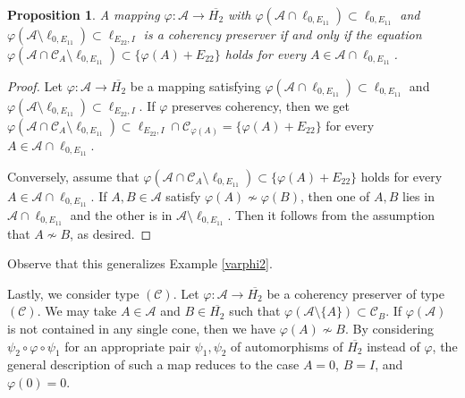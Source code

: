 \documentclass[10pt]{amsart}
\newtheorem{proposition}[theorem]{Proposition}
\theoremstyle{definition}
\theoremstyle{remark}
\numberwithin{subsection}{section}
\numberwithin{equation}{section}
\newcommand\cC{{\mathcal{C}}}
\newcommand\oH{{\overline{H_2}}}
\begin{document}
\begin{proposition}\label{ljzggr}
A mapping $\varphi\colon \mathcal{A}\to \oH$ with $\varphi(\mathcal{A}\cap \ell_{0, E_{11}})\subset \ell_{0, E_{11}}$ and $\varphi(\mathcal{A}\setminus  \ell_{0, E_{11}})\subset \ell_{E_{22}, I}$ is a coherency preserver if and only if the equation $\varphi(\mathcal{A}\cap \mathcal{C}_A\setminus  \ell_{0, E_{11}}) \subset\{\varphi(A)+E_{22}\}$ holds for every $A\in \mathcal{A}\cap \ell_{0, E_{11}}$. 
\end{proposition}
\begin{proof}
Let $\varphi\colon \mathcal{A}\to \oH$ be a mapping satisfying $\varphi(\mathcal{A}\cap \ell_{0, E_{11}})\subset \ell_{0, E_{11}}$ and $\varphi(\mathcal{A}\setminus  \ell_{0, E_{11}})\subset \ell_{E_{22}, I}$. 
If $\varphi$ preserves coherency, then we get $\varphi(\mathcal{A}\cap \mathcal{C}_A\setminus  \ell_{0, E_{11}}) \subset \ell_{E_{22}, I} \cap \cC_{\varphi(A)}=\{\varphi(A)+E_{22}\}$ for every $A\in \mathcal{A}\cap \ell_{0, E_{11}}$. 

Conversely, assume that $\varphi(\mathcal{A}\cap \mathcal{C}_A\setminus  \ell_{0, E_{11}}) \subset \{\varphi(A)+E_{22}\}$ holds for every $A\in \mathcal{A}\cap \ell_{0, E_{11}}$. 
If $A, B\in \mathcal{A}$ satisfy $\varphi(A)\not\sim \varphi(B)$, then one of $A, B$ lies in $\mathcal{A}\cap \ell_{0, E_{11}}$ and the other is in $\mathcal{A}\setminus  \ell_{0, E_{11}}$. 
Then it follows from the assumption that $A\not\sim B$, as desired.
\end{proof}
Observe that this generalizes Example \ref{varphi2}.

Lastly, we consider type $(\mathcal{C})$. 
Let $\varphi\colon \mathcal{A}\to \oH$ be a coherency preserver of type $(\mathcal{C})$. 
We may take $A\in \mathcal{A}$ and $B\in \oH$ such that $\varphi(\mathcal{A}\setminus \{A\})\subset \mathcal{C}_B$. 
If $\varphi(\mathcal{A})$ is not contained in any single cone, then we have $\varphi(A)\not\sim B$. 
By considering $\psi_2\circ \varphi\circ\psi_1$ for an appropriate pair $\psi_1, \psi_2$ of automorphisms of $\oH$ instead of $\varphi$, the general description of such a map reduces to the case $A=0$, $B=I$, and $\varphi(0)=0$.
\end{document}
